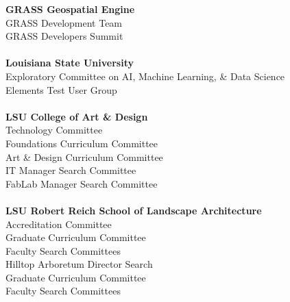 \documentclass[10pt]{designcv}
\begin{document}

\printbibliography[title={\cvsect{Awards}\vspace*{-2em}}, keyword=awards, heading=subbibliography]


\clearpage


\begin{minipage}[t]{0.7\textwidth}
\raggedright
\textbf{GRASS Geospatial Engine}\\
GRASS Development Team\\
GRASS Developers Summit\\
\ \\
\textbf{Louisiana State University}\\
Exploratory Committee on AI, Machine Learning, \& Data Science\\
Elements Test User Group\\
\ \\
\textbf{LSU College of Art \& Design}\\
Technology Committee\\
Foundations Curriculum Committee\\
Art \& Design Curriculum Committee\\
IT Manager Search Committee\\
FabLab Manager Search Committee\\
\ \\
\textbf{LSU Robert Reich School of Landscape Architecture}\\ 
Accreditation Committee\\
Graduate Curriculum Committee\\
Faculty Search Committees\\
Hilltop Arboretum Director Search\\
Graduate Curriculum Committee\\
Faculty Search Committees\\
\end{minipage}
\hfill
\end{document}
